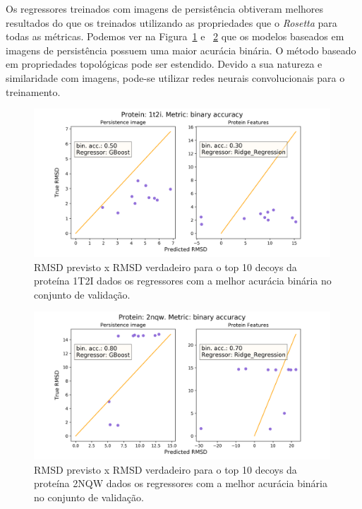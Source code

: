 Os regressores treinados com imagens de persistência obtiveram melhores resultados 
do que os treinados utilizando as propriedades que o \textit{Rosetta} para todas as métricas.
Podemos ver na Figura~\ref{fig:1t2i_binary} e ~\ref{fig:2nqw_binary} que os modelos baseados em 
imagens de persistência possuem uma maior acurácia binária. O método baseado em propriedades topológicas
pode ser estendido. Devido a sua natureza e similaridade com imagens, pode-se utilizar redes neurais 
convolucionais para o treinamento. 
\begin{figure}[!htbp]
    \centering
    \includegraphics[width=0.99\textwidth]{images/relatorio/1t2i_binary.png}
    \caption{RMSD previsto x RMSD verdadeiro para o top 10 decoys da proteína 1T2I dados os 
             regressores com a melhor acurácia binária no conjunto de validação.}
    \label{fig:1t2i_binary}
\end{figure}

\begin{figure}[!htbp]
    \centering
    \includegraphics[width=0.99\textwidth]{images/relatorio/2nqw_binary.png}
    \caption{RMSD previsto x RMSD verdadeiro para o top 10 decoys da proteína 2NQW dados os 
             regressores com a melhor acurácia binária no conjunto de validação.}
    \label{fig:2nqw_binary}
\end{figure}

